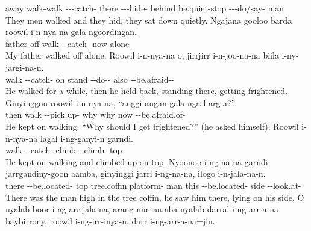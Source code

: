 \begin{exye}
away walk-walk ---catch- there ---hide- behind be.quiet-stop ---do/say- man\\
\ft They men walked and they hid, they sat down quietly.
\exy {}
\gll Ngajana gooloo barda roowil i-n-nya-na gala ngoordingan.\\
 father off walk --catch- now alone\\
\ft My father walked off alone.
\exy {}
\gll Roowil i-n-nya-na o, jirrjirr i-n-joo-na-na biila i-ny-jargi-na-n.\\
walk --catch- oh stand --do-- also --be.afraid--\\
\ft He walked for a while, then he held back, standing there, getting frightened.
\exy {}
\gll Ginyinggon roowil i-n-nya-na, ``anggi angan gala nga-l-arg-a?''\\
then walk --pick.up- why why now --be.afraid.of-\\
\ft He kept on walking. ``Why should I get frightened?'' (he asked himself).
\exy {}
\gll Roowil i-n-nya-na lagal i-ng-ganyi-n garndi.\\
walk --catch- climb --climb- top\\
\ft He kept on walking and climbed up on top.
\exy {}
\gll Nyoonoo i-ng-na-na garndi jarrgandiny-goon aamba, ginyinggi jarri i-ng-na-na, ilogo i-n-jala-na-n.\\
there --be.located- top tree.coffin.platform- man  this --be.located- side --look.at-\\
\ft There was the man high in the tree coffin, he saw him there, lying on his side.
\exy {}
\gll O nyalab boor i-ng-arr-jala-na, arang-nim aamba nyalab darral i-ng-arr-a-na baybirrony, roowil i-ng-irr-inya-n, darr i-ng-arr-a-na=jin.\\

\end{exye}
